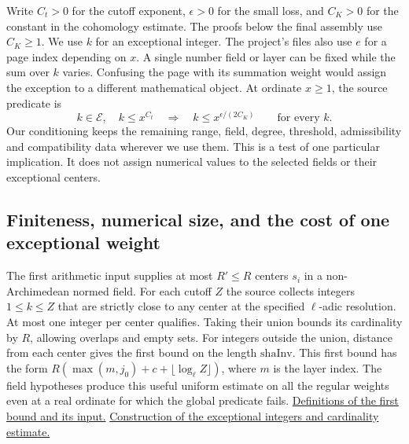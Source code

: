 \documentclass[12pt,letterpaper]{article}
\begin{document}
Write \(C_t>0\) for the cutoff exponent, \(\epsilon>0\) for the small loss, and \(C_K>0\) for the constant in the cohomology estimate. The proofs below the final assembly use \(C_K\ge1\). We use \(k\) for an exceptional integer. The project's files also use \(e\) for a page index depending on \(x\). A single number field or layer can be fixed while the sum over \(k\) varies. Confusing the page with its summation weight would assign the exception to a different mathematical object. At ordinate \(x\ge1\), the source predicate is
\[
     k\in\mathcal E,\quad k\le x^{C_t}
          \quad\Longrightarrow\quad k\le x^{\epsilon/(2C_K)}
          \qquad\text{for every }k .
\]
Our conditioning keeps the remaining range, field, degree, threshold, admissibility and compatibility data wherever we use them. This is a test of one particular implication. It does not assign numerical values to the selected fields or their exceptional centers.

\providecommand{\bandorig}[3]{\href{https://github.com/nousentllc/riemann-hypothesis/blob/40e56bab026552e089d7afcfeff08d2defb9c005/src/Development/AutomorphicArithmetic/#1.lean\#L#2}{#3}}
\providecommand{\bandly}[3]{\bandorig{AutomorphicVarieties/LayeredIsomorphisms/#1}{#2}{#3}}
\subsection{Finiteness, numerical size, and the cost of one exceptional weight}
The first arithmetic input supplies at most \(R'\le R\) centers \(s_i\) in a non-Archimedean normed field. For each cutoff \(Z\) the source collects integers \(1\le k\le Z\) that are strictly close to any center at the specified \(\ell\)-adic resolution. At most one integer per center qualifies. Taking their union bounds its cardinality by \(R\), allowing overlaps and empty sets. For integers outside the union, distance from each center gives the first bound on the length \(\mathrm{shaInv}\). This first bound has the form \(R(\max(m,j_0)+c+\lfloor\log_\ell Z\rfloor)\), where \(m\) is the layer index. The field hypotheses produce this useful uniform estimate on all the regular weights even at a real ordinate for which the global predicate fails. \bandly{SecondBound}{19-L30}{Definitions of the first bound and its input.} \bandly{Exc}{14-L42}{Construction of the exceptional integers and cardinality estimate.}
\end{document}
